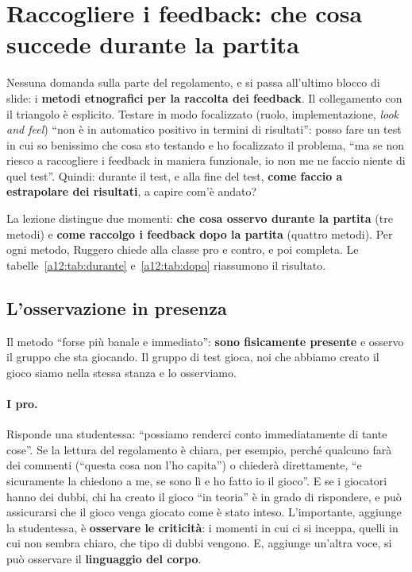 \section{Raccogliere i feedback: che cosa succede durante la partita}
\label{a12:sec:osservare}



Nessuna domanda sulla parte del regolamento, e si passa all'ultimo blocco di slide: i
\textbf{metodi etnografici per la raccolta dei feedback}. Il collegamento con il
triangolo è esplicito. Testare in modo focalizzato (ruolo, implementazione, \emph{look and
feel}) ``non è in automatico positivo in termini di risultati'': posso fare un test in cui
so benissimo che cosa sto testando e ho focalizzato il problema, ``ma se non riesco a
raccogliere i feedback in maniera funzionale, io non me ne faccio niente di quel test''.
Quindi: durante il test, e alla fine del test, \textbf{come faccio a estrapolare dei
risultati}, a capire com'è andato?

La lezione distingue due momenti: \textbf{che cosa osservo durante la partita} (tre
metodi) e \textbf{come raccolgo i feedback dopo la partita} (quattro metodi). Per ogni
metodo, Ruggero chiede alla classe pro e contro, e poi completa. Le
tabelle~\ref{a12:tab:durante} e~\ref{a12:tab:dopo} riassumono il risultato.

\subsection{L'osservazione in presenza}

Il metodo ``forse più banale e immediato'': \textbf{sono fisicamente presente} e osservo
il gruppo che sta giocando. Il gruppo di test gioca, noi che abbiamo creato il gioco
siamo nella stessa stanza e lo osserviamo.

\paragraph{I pro.} Risponde una studentessa: ``possiamo renderci conto immediatamente di
tante cose''. Se la lettura del regolamento è chiara, per esempio, perché qualcuno farà
dei commenti (``questa cosa non l'ho capita'') o chiederà direttamente, ``e sicuramente
la chiedono a me, se sono lì e ho fatto io il gioco''. E se i giocatori hanno dei dubbi,
chi ha creato il gioco ``in teoria'' è in grado di rispondere, e può assicurarsi che il
gioco venga giocato come è stato inteso. L'importante, aggiunge la studentessa, è
\textbf{osservare le criticità}: i momenti in cui ci si inceppa, quelli in cui non sembra
chiaro, che tipo di dubbi vengono. E, aggiunge un'altra voce, si può osservare il
\textbf{linguaggio del corpo}.

